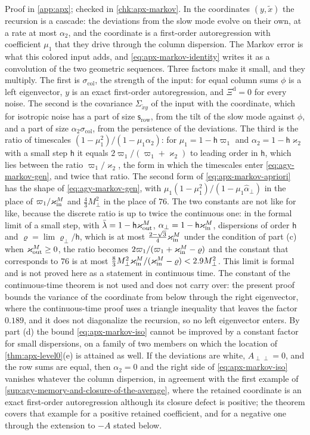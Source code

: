 Proof in \cref{app:apx}; checked in \cref{chk:apx-markov}. In the coordinates $(y,\tilde x)$ the recursion is a cascade: the deviations from the slow mode evolve on their own, at a rate at most $\alpha_2$, and the coordinate is a first-order autoregression with coefficient $\mu_1$ that they drive through the column dispersion. The Markov error is what this colored input adds, and \eqref{eq:apx-markov-identity} writes it as a convolution of the two geometric sequences. Three factors make it small, and they multiply. The first is $\sigma_{\mathrm{col}}$, the strength of the input: for equal column sums $\phi$ is a left eigenvector, $y$ is an exact first-order autoregression, and $\Xi^{\mathrm d}=0$ for every noise. The second is the covariance $\Sigma_{\tilde xy}$ of the input with the coordinate, which for isotropic noise has a part of size $\mathsf s_{\mathrm{row}}$, from the tilt of the slow mode against $\phi$, and a part of size $\alpha_2\sigma_{\mathrm{col}}$, from the persistence of the deviations. The third is the ratio of timescales $(1-\mu_1^2)/(1-\mu_1\alpha_2)$: for $\mu_1=1-\mathsf h\varpi_1$ and $\alpha_2=1-\mathsf h\varkappa_2$ with a small step $\mathsf h$ it equals $2\varpi_1/(\varpi_1+\varkappa_2)$ to leading order in $\mathsf h$, which lies between the ratio $\varpi_1/\varkappa_2$, the form in which the timescales enter \eqref{eq:agy-markov-gen}, and twice that ratio. The second form of \eqref{eq:apx-markov-apriori} has the shape of \eqref{eq:agy-markov-gen}, with $\mu_1(1-\mu_1^2)/(1-\mu_1\hat\alpha_\perp)$ in the place of $\varpi_1/\varkappa_{\mathrm{in}}^M$ and $\frac43M_\perp^2$ in the place of $76$. The two constants are not like for like, because the discrete ratio is up to twice the continuous one: in the formal limit of a small step, with $\bar\lambda=1-\mathsf h\varkappa_{\mathrm{out}}^M$, $\alpha_\perp=1-\mathsf h\varkappa_{\mathrm{in}}^M$, dispersions of order $\mathsf h$ and $\varrho=\lim\varrho_\perp/\mathsf h$, which is at most $\frac{2-\sqrt3}4\varkappa_{\mathrm{in}}^M$ under the condition of part (c) when $\varkappa_{\mathrm{out}}^M\ge0$, the ratio becomes $2\varpi_1/(\varpi_1+\varkappa_{\mathrm{in}}^M-\varrho)$ and the constant that corresponds to $76$ is at most $\frac83M_\perp^2\varkappa_{\mathrm{in}}^M/(\varkappa_{\mathrm{in}}^M-\varrho)<2.9M_\perp^2$. This limit is formal and is not proved here as a statement in continuous time. The constant of the continuous-time theorem is not used and does not carry over: the present proof bounds the variance of the coordinate from below through the right eigenvector, where the continuous-time proof uses a triangle inequality that leaves the factor $0.189$, and it does not diagonalize the recursion, so no left eigenvector enters. By part (d) the bound \eqref{eq:apx-markov-iso} cannot be improved by a constant factor for small dispersions, on a family of two members on which the location of \cref{thm:apx-level0}(e) is attained as well. If the deviations are white, $A_{\perp\perp}=0$, and the row sums are equal, then $\alpha_2=0$ and the right side of \eqref{eq:apx-markov-iso} vanishes whatever the column dispersion, in agreement with the first example of \cref{sup:agy-memory-and-closure-of-the-average}, where the retained coordinate is an exact first-order autoregression although its closure defect is positive; the theorem covers that example for a positive retained coefficient, and for a negative one through the extension to $-A$ stated below.

